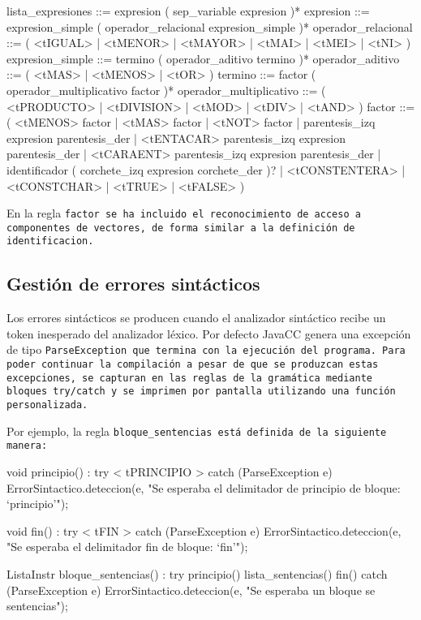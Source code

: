 \begin{codigo}
lista_expresiones ::= expresion ( sep_variable expresion )*
expresion ::= expresion_simple ( operador_relacional expresion_simple )*
operador_relacional ::= ( <tIGUAL> | <tMENOR> | <tMAYOR> | <tMAI> | <tMEI> | <tNI> )
expresion_simple ::= termino ( operador_aditivo termino )*
operador_aditivo ::= ( <tMAS> | <tMENOS> | <tOR> )
termino ::= factor ( operador_multiplicativo factor )*
operador_multiplicativo ::= ( <tPRODUCTO> | <tDIVISION> | <tMOD> | <tDIV> | <tAND> )
factor ::= ( <tMENOS> factor | <tMAS> factor | <tNOT> factor | parentesis_izq expresion parentesis_der | <tENTACAR> parentesis_izq expresion parentesis_der | <tCARAENT> parentesis_izq expresion parentesis_der | identificador ( corchete_izq expresion corchete_der )? | <tCONSTENTERA> | <tCONSTCHAR> | <tTRUE> | <tFALSE> )
\end{codigo}

En la regla \tt{factor} se ha incluido el reconocimiento de acceso a componentes de vectores, de forma similar a la definición de \tt{identificacion}.

\subsection{Gestión de errores sintácticos}

Los errores sintácticos se producen cuando el analizador sintáctico recibe un token inesperado del analizador léxico. Por defecto JavaCC genera una excepción de tipo \tt{ParseException} que termina con la ejecución del programa. Para poder continuar la compilación a pesar de que se produzcan estas excepciones, se capturan en las reglas de la gramática mediante bloques \tt{try}/\tt{catch} y se imprimen por pantalla utilizando una función personalizada.

Por ejemplo, la regla \tt{bloque\_sentencias} está definida de la siguiente manera:

\begin{codigo}
void principio() :
{}
{
  try {
    < tPRINCIPIO >
  }
  catch (ParseException e) {
    ErrorSintactico.deteccion(e, "Se esperaba el delimitador de principio de bloque: `principio'");
  }
}

void fin() :
{}
{
  try {
    < tFIN >
  }
  catch (ParseException e) {
    ErrorSintactico.deteccion(e, "Se esperaba el delimitador fin de bloque: `fin'");
  }
}

ListaInstr bloque_sentencias() :
{}
{
  try {
    principio() lista_sentencias() fin()
  }
  catch (ParseException e) {
    ErrorSintactico.deteccion(e, "Se esperaba un bloque se sentencias");
  }
}
\end{codigo}

